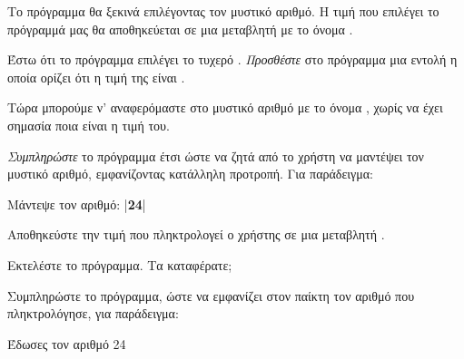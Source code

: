 \documentclass[a4paper,11pt,oneside]{book}
\begin{document}
\begin{step}
\label{step:secret-assign}
Το πρόγραμμα θα ξεκινά επιλέγοντας τον μυστικό αριθμό. 
Η τιμή %
που επιλέγει το πρόγραμμά μας θα αποθηκεύεται σε μια μεταβλητή με το όνομα .

Έστω ότι το πρόγραμμα επιλέγει το τυχερό .
\emph{Προσθέστε} στο πρόγραμμα μια εντολή η οποία ορίζει ότι η τιμή της  είναι .

Τώρα μπορούμε ν' αναφερόμαστε στο μυστικό αριθμό με το όνομα , χωρίς να έχει σημασία ποια είναι η τιμή του.
\end{step}

\clearpage
\begin{step}
\label{step:number-input}
\emph{Συμπληρώστε} το πρόγραμμα έτσι ώστε να ζητά από το χρήστη να μαντέψει τον μυστικό αριθμό, εμφανίζοντας κατάλληλη προτροπή.
Για παράδειγμα:

\marginnote[24pt]{\iconcomputer\hspace{1ex}\iconkeyboard}
\begin{pyterm}
Μάντεψε τον αριθμό:
|\textbf{24}|
\end{pyterm}

Αποθηκεύστε την τιμή που πληκτρολογεί ο χρήστης σε μια μεταβλητή .

Εκτελέστε το πρόγραμμα. Τα καταφέρατε;

\marginnote[14pt]{\icondiscuss}
\dottedline
\end{step}

\begin{step}
Συμπληρώστε το πρόγραμμα, ώστε να εμφανίζει στον παίκτη τον αριθμό που πληκτρολόγησε, για παράδειγμα:

\marginnote[16pt]{\iconcomputer}
\begin{pyterm}
Έδωσες τον αριθμό 24
\end{pyterm}

\end{step}
\end{document}

